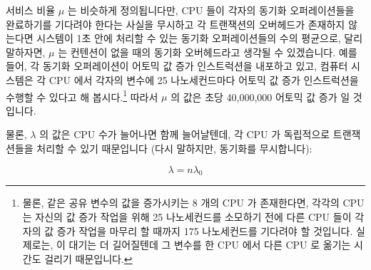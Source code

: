 서비스 비율 $\mu$ 는 비슷하게 정의됩니다만, CPU 들이 각자의 동기화
오퍼레이션들을 완료하기를 기다려야 한다는 사실을 무시하고 각 트랜잭션의
오버헤드가 존재하지 않는다면 시스템이 1초 안에 처리할 수 있는 동기화
오퍼레이션들의 수의 평균으로, 달리 말하자면, $\mu$ 는 컨텐션이 없을 때의 동기화
오버헤드라고 생각될 수 있겠습니다.
예를 들어, 각 동기화 오퍼레이션이 어토믹 값 증가 인스트럭션을 내포하고 있고,
컴퓨터 시스템은 각 CPU 에서 각자의 변수에 25 나노세컨드마다 어토믹 값 증가
인스트럭션을 수행할 수 있다고 해 봅시다.\footnote{
	물론, 같은 공유 변수의 값을 증가시키는 8 개의 CPU 가 존재한다면, 각각의
	CPU 는 자신의 값 증가 작업을 위해 25 나노세컨드를 소모하기 전에 다른
	CPU 들이 각자의 값 증가 작업을 마무리 할 때까지 175 나노세컨드를
	기다려야 할 것입니다.
	실제로는, 이 대기는 더 길어질텐데 그 변수를 한 CPU 에서 다른 CPU 로
	옮기는 시간도 걸리기 때문입니다.}
따라서 $\mu$ 의 값은 초당 40,000,000 어토믹 값 증가 일 것입니다.

물론, $\lambda$ 의 값은 CPU 수가 늘어나면 함께 늘어날텐데, 각 CPU 가 독립적으로
트랜잭션들을 처리할 수 있기 때문입니다 (다시 말하지만, 동기화를 무시합니다):

\begin{equation}
	\lambda = n \lambda_0
\end{equation}

